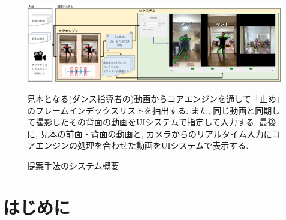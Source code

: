 \documentclass[paper]{ieicej}
\begin{document}
\begin{figure}[t]  %
  \centering
  \includegraphics[width=\textwidth]{./images/summary.png}
  \caption{提案手法のシステム概要}
  \label{fig:summary}
  \begin{flushleft}
    \footnotesize 見本となる(ダンス指導者の)動画からコアエンジンを通して「止め」のフレームインデックスリストを抽出する. また, 同じ動画と同期して撮影したその背面の動画をUIシステムで指定して入力する. 最後に, 見本の前面・背面の動画と, カメラからのリアルタイム入力にコアエンジンの処理を合わせた動画をUIシステムで表示する.
  \end{flushleft}
\end{figure}

\section{はじめに}
\end{document}
